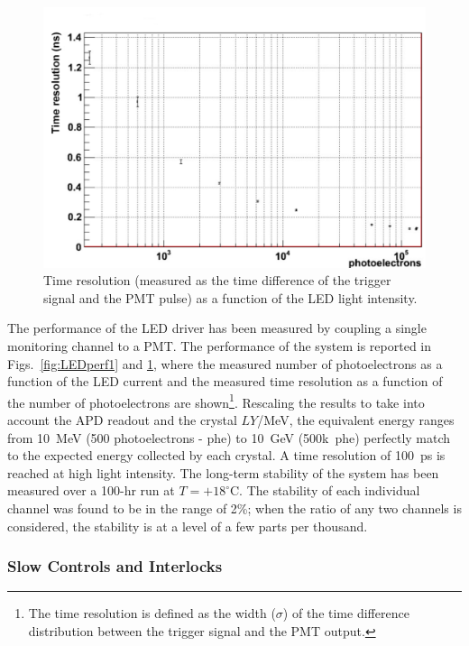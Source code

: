 \begin{figure}[th!]
\centering 
\includegraphics[width=1.0\columnwidth]{./fig/timing.pdf}
\caption{Time resolution (measured as the time difference of the trigger signal and the PMT pulse) as a function of
  the LED light intensity.}
\label{fig:LEDperf2} 
\end{figure}

The performance of the LED driver has been measured by coupling a single monitoring channel to a PMT. The
performance of the system is reported in Figs.~\ref{fig:LEDperf1} and \ref{fig:LEDperf2}, where the measured
number of photoelectrons as a function of the LED current and the measured time resolution as a function of the
number of photoelectrons are shown\footnote{The time resolution is defined as the width ($\sigma$) of the time
  difference distribution between the trigger signal and the PMT output.}. Rescaling the results to take into account
the APD readout and the crystal $LY$/MeV, the equivalent energy ranges from 10~MeV (500 photoelectrons - phe)
to 10~GeV (500k~phe) perfectly match to the expected energy collected by each crystal. A time resolution of
100~ps is reached at high light intensity. The long-term stability of the system has been measured over a 100-hr run
at $T=+18^\circ$C. The stability of each individual channel was found to be in the range of 2\%; when the ratio of any
two channels is considered, the stability is at a level of a few parts per thousand.

\subsubsection{Slow Controls and Interlocks}

